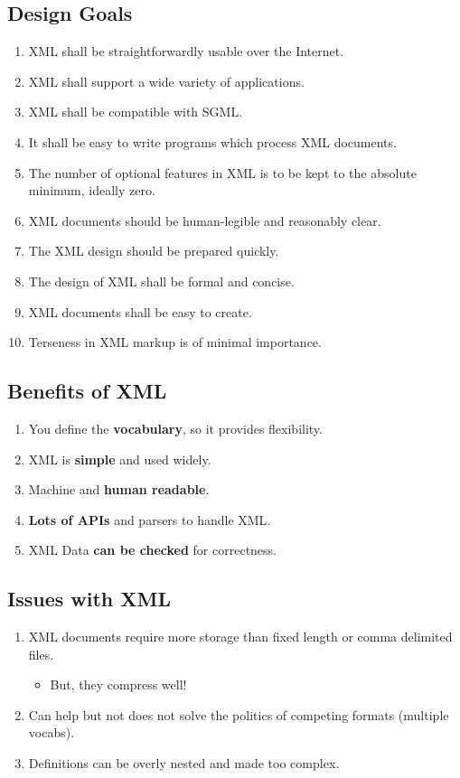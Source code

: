 \documentclass{pgnotes}
\begin{document}
\inputminted{xml}{intro.xml}

\subsection{Design Goals}

\begin{enumerate}
\item XML shall be straightforwardly usable over the Internet.
\item XML shall support a wide variety of applications.
\item XML shall be compatible with SGML.
\item It shall be easy to write programs which process XML documents.
\item The number of optional features in XML is to be kept to the absolute minimum, ideally zero.
\item XML documents should be human-legible and reasonably clear.
\item The XML design should be prepared quickly.
\item The design of XML shall be formal and concise.
\item XML documents shall be easy to create.
\item Terseness in XML markup is of minimal importance.
\end{enumerate}

 

\subsection{Benefits of XML}

\begin{enumerate}
\item You define the \textbf{vocabulary}, so it provides flexibility.
\item XML is \textbf{simple} and used widely.
\item Machine and \textbf{human readable}.
\item \textbf{Lots of APIs} and parsers to handle XML. 
\item XML Data \textbf{can be checked} for correctness.
\end{enumerate}

\subsection{Issues with XML}

\begin{enumerate}
\item XML documents require more storage than fixed length or comma delimited files.
  \begin{itemize}
  \item But, they compress well!
  \end{itemize}
\item Can help but not does not solve the politics of competing formats (multiple vocabs).
\item Definitions can be overly nested and made too complex.
\end{enumerate}
 
\end{document}
